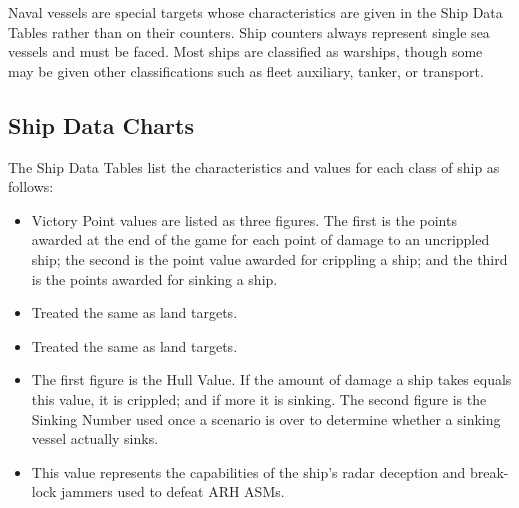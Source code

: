 Naval vessels are special targets whose characteristics are given in the Ship Data Tables rather than on their counters.  Ship counters always represent single sea vessels and must be faced.  Most ships are classified as warships, though some may be given other classifications such as fleet auxiliary, tanker, or transport.

\subsection{Ship Data Charts}
The Ship Data Tables list the characteristics and values for each class of ship as follows:

\begin{itemize}



    \item {} Victory Point values are listed as three figures.  The first is the points awarded at the end of the game for each point of damage to an uncrippled ship; the second is the point value awarded for crippling a ship; and the third is the points awarded for sinking a ship.

    \item {} Treated the same as land targets.

    \item {} Treated the same as land targets.

    \item {} The first figure is the Hull Value.  If the amount of damage a ship takes equals this value, it is crippled; and if more it is sinking. The second figure is the Sinking Number used once a scenario is over to determine whether a sinking vessel actually sinks.

    \item {} This value represents the capabilities of the ship's radar deception and break-lock jammers used to defeat ARH ASMs.


\end{itemize}
